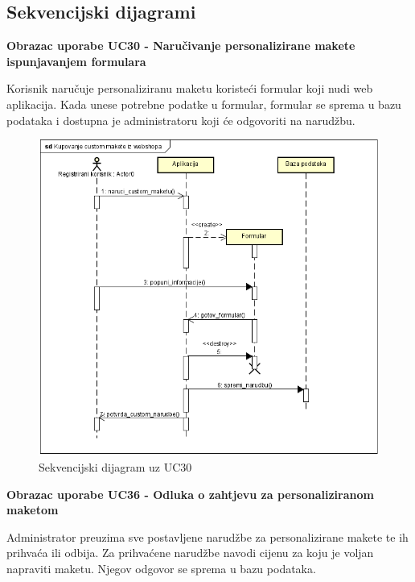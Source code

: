 					
				\eject		
				
			\subsection{Sekvencijski dijagrami}
				
				\textbf{Obrazac uporabe UC30 - Naručivanje personalizirane makete ispunjavanjem formulara}
				
				Korisnik naručuje personaliziranu maketu koristeći formular koji nudi web aplikacija. Kada unese potrebne podatke u formular, formular se sprema u bazu podataka i dostupna je administratoru koji će odgovoriti na narudžbu.
				
				\begin{figure} [!h]
					\centering
					\includegraphics[scale=0.65]{"slike/seqdiag_01"}
					\caption{Sekvencijski dijagram uz UC30}
					\label{fig:seqdiag_01}
				\end{figure}
				\pagebreak
				
				\textbf{Obrazac uporabe UC36 - Odluka o zahtjevu za personaliziranom maketom}
				
				Administrator preuzima sve postavljene narudžbe za personalizirane makete te ih prihvaća ili odbija. Za prihvaćene narudžbe navodi cijenu za koju je voljan napraviti maketu. Njegov odgovor se sprema u bazu podataka. 
				

